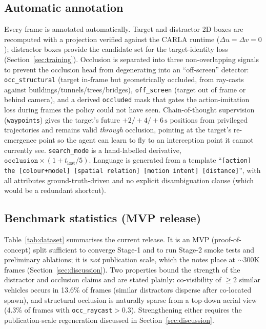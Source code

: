 \documentclass[11pt]{article}
\begin{document}
\subsection{Automatic annotation}
\label{sec:benchmark-annotation}
Every frame is annotated automatically. Target and distractor 2D boxes are
recomputed with a projection verified against the CARLA runtime
($\Delta u=\Delta v=0$); distractor boxes provide the candidate set for the
target-identity loss (Section~\ref{sec:training}). Occlusion is separated
into three non-overlapping signals to prevent the occlusion head from
degenerating into an ``off-screen'' detector: \texttt{occ\_structural}
(target in-frame but geometrically occluded, from ray-casts against
buildings/tunnels/trees/bridges), \texttt{off\_screen} (target out of frame
or behind camera), and a derived \texttt{occluded} mask that gates the
action-imitation loss during frames the policy could not have seen.
Chain-of-thought supervision (\texttt{waypoints}) gives the target's future
$+2/{+}4/{+}6\,\mathrm{s}$ positions from privileged trajectories and remains
valid \emph{through} occlusion, pointing at the target's re-emergence point
so the agent can learn to fly to an interception point it cannot currently
see. \texttt{search\_mode} is a hand-labelled derivative,
$\texttt{occlusion}\times(1+t_{\mathrm{lost}}/5)$. Language is generated from
a template
``\texttt{[action] the [colour+model] [spatial relation] [motion intent]
[distance]}'', with all attributes ground-truth-driven and no explicit
disambiguation clause (which would be a redundant shortcut).

\subsection{Benchmark statistics (MVP release)}
\label{sec:benchmark-stats}
Table~\ref{tab:dataset} summarises the current release. It is an MVP
(proof-of-concept) split sufficient to converge Stage-1 and to run
Stage-2 smoke tests and preliminary ablations; it is \emph{not} publication
scale, which the notes place at $\sim$300K frames
(Section~\ref{sec:discussion}). Two properties bound the strength of the
distractor and occlusion claims and are stated plainly: co-visibility of
$\geq 2$ similar vehicles occurs in 13.6\% of frames (similar
distractors disperse after co-located spawn), and structural occlusion is
naturally sparse from a top-down aerial view (4.3\% of frames
with \texttt{occ\_raycast}${>}0.3$). Strengthening either requires the
publication-scale regeneration discussed in Section~\ref{sec:discussion}.
\end{document}
